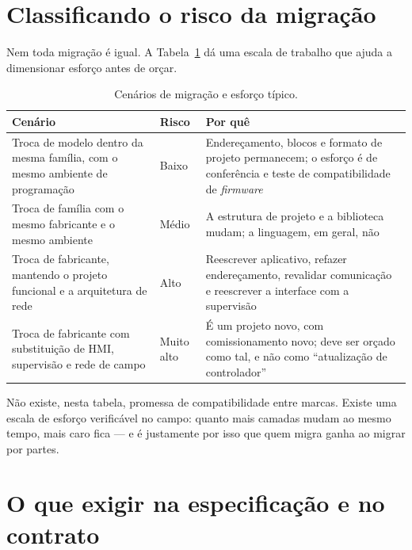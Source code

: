 \section{Classificando o risco da migração}

Nem toda migração é igual. A Tabela~\ref{tab:risco-migracao} dá uma escala de trabalho que ajuda a
dimensionar esforço antes de orçar.

\begin{table}[H]
  \centering
  \caption{Cenários de migração e esforço típico.}
  \label{tab:risco-migracao}
  \begin{tabular}{p{5.0cm} p{2.4cm} p{6.8cm}}
    \toprule
    Cenário & Risco & Por quê \\
    \midrule
    Troca de modelo dentro da mesma família, com o mesmo ambiente de programação
      & Baixo
      & Endereçamento, blocos e formato de projeto permanecem; o esforço é de conferência e teste
        de compatibilidade de \emph{firmware} \\
    \addlinespace
    Troca de família com o mesmo fabricante e o mesmo ambiente
      & Médio
      & A estrutura de projeto e a biblioteca mudam; a linguagem, em geral, não \\
    \addlinespace
    Troca de fabricante, mantendo o projeto funcional e a arquitetura de rede
      & Alto
      & Reescrever aplicativo, refazer endereçamento, revalidar comunicação e reescrever a interface
        com a supervisão \\
    \addlinespace
    Troca de fabricante com substituição de HMI, supervisão e rede de campo
      & Muito alto
      & É um projeto novo, com comissionamento novo; deve ser orçado como tal, e não como
        ``atualização de controlador'' \\
    \bottomrule
  \end{tabular}
\end{table}

Não existe, nesta tabela, promessa de compatibilidade entre marcas. Existe uma escala de esforço
verificável no campo: quanto mais camadas mudam ao mesmo tempo, mais caro fica --- e é justamente por
isso que quem migra ganha ao migrar por partes.


\section{O que exigir na especificação e no contrato}


